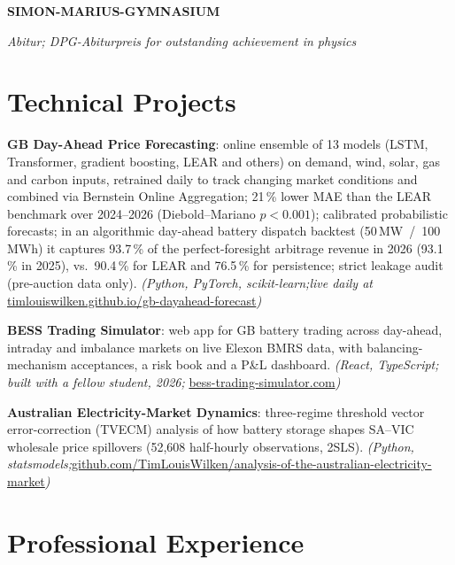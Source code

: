 \documentclass[10.5pt,a4paper]{article}
\newcommand{\entry}[4]{%
  \par\vspace{2pt}\nobreak
  {\textbf{#1}\nobreak\hfill\nobreak{\color{grey}#2}}\par\nobreak\vspace{1pt}
  {\textit{#3}\nobreak\hfill\nobreak{\itshape\color{grey}#4}}\par\nobreak\vspace{1pt}%
}
\begin{document}
\entry{SIMON-MARIUS-GYMNASIUM}{Gunzenhausen, Germany}
      {Abitur; DPG-Abiturpreis for outstanding achievement in physics}{2012 -- 2020}

\section{Technical Projects}
\begin{pts}
  \item \textbf{GB Day-Ahead Price Forecasting}: online ensemble of 13 models (LSTM, Transformer, gradient boosting, LEAR and others) on demand, wind, solar, gas and carbon inputs, retrained daily to track changing market conditions and combined via Bernstein Online Aggregation; 21\,\% lower MAE than the LEAR benchmark over 2024--2026 (Diebold--Mariano \mbox{$p < 0.001$}); calibrated probabilistic forecasts; in an algorithmic day-ahead battery dispatch backtest \mbox{(50\,MW / 100\,MWh)} it captures 93.7\,\% of the perfect-foresight arbitrage revenue in 2026 (93.1\,\% in 2025), vs.\ 90.4\,\% for LEAR and 76.5\,\% for persistence; strict leakage audit (pre-auction data only). \textit{(Python, PyTorch, scikit-learn;}\newline\textit{live daily at} \href{https://timlouiswilken.github.io/gb-dayahead-forecast/}{timlouiswilken.github.io/gb-dayahead-forecast}\textit{)}
  \item \textbf{BESS Trading Simulator}: web app for GB battery trading across day-ahead, intraday and imbalance markets on live Elexon BMRS data, with balancing-mechanism acceptances, a risk book and a P\&L dashboard. \textit{(React, TypeScript; built with a fellow student, 2026;} \href{https://bess-trading-simulator.com}{bess-trading-simulator.com}\textit{)}
  \item \textbf{Australian Electricity-Market Dynamics}: three-regime threshold vector error-correction (TVECM) analysis of how battery storage shapes SA--VIC wholesale price spillovers (52,608 half-hourly observations, 2SLS). \textit{(Python, statsmodels;}\newline\href{https://github.com/TimLouisWilken/analysis-of-the-australian-electricity-market}{github.com/TimLouisWilken/analysis-of-the-australian-electricity-market}\textit{)}
\end{pts}

\section{Professional Experience}
\end{document}
